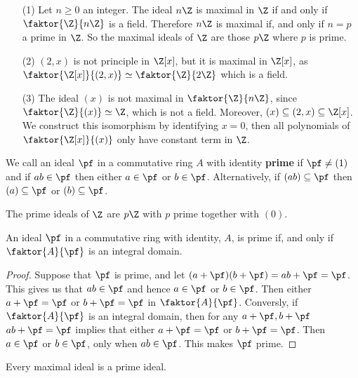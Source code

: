 \begin{example}\label{1.15}
    \begin{enumerate}
        \item[(1)] Let $n \geq 0$ an integer. The ideal  $n\Z$ is maximal in
            $\Z$ if and only if  $\faktor{\Z}{n\Z}$ is a field. Therefore $n\Z$
            is maximal if, and only if  $n=p$ a prime in $\Z$. So the maximal
            ideals of $\Z$ are those  $p\Z$ where  $p$ is prime.

        \item[(2)] $(2,x)$ is not principle in $\Z[x]$, but it is maximal in
            $\Z[x]$, as $\faktor{\Z[x]}{(2,x)} \simeq \faktor{\Z}{2\Z}$ which
            is a field.

        \item[(3)] The ideal $(x)$ is not maximal in $\faktor{\Z}{n\Z}$, since
            $\faktor{\Z}{(x)} \simeq \Z$, which is not a field. Moreover, $(x)
            \subseteq (2,x) \subseteq \Z[x]$. We construct this isomorphism by
            identifying $x=0$, then all polynomials of $\faktor{\Z[x]}{(x)}$ only
            have constant term in $\Z$.
    \end{enumerate}
\end{example}

\begin{definition}
    We call an ideal $\pf$ in a commutative ring  $A$ with identity
    \textbf{prime} if $\pf \neq (1)$ and if $ab \in \pf$ then either $a \in \pf$
    or $b \in \pf$. Alternatively, if $(ab) \subseteq \pf$ then $(a) \subseteq
    \pf$ or $(b) \subseteq \pf$.
\end{definition}

\begin{example}\label{1.16}
    The prime ideals of $\Z$ are $p\Z$ with  $p$ prime together with $(0)$.
\end{example}

\begin{lemma}\label{1.4.4}
    An ideal $\pf$ in a commutative ring with identity, $A$, is prime if, and
    only if $\faktor{A}{\pf}$ is an integral domain.
\end{lemma}
\begin{proof}
    Suppose that $\pf$ is prime, and let  $(a+\pf)(b+\pf)=ab+\pf=\pf$. This
    gives us that $ab \in \pf$ and hence  $a \in \pf$ or  $b \in \pf$. Then
    either $a+\pf=\pf$ or $b+\pf=\pf$ in $\faktor{A}{\pf}$. Conversly, if
    $\faktor{A}{\pf}$ is an integral domain, then for any $a+\pf,b+\pf$
    $ab+\pf=\pf$ implies that either $a+\pf=\pf$ or  $b+\pf=\pf$. Then
     $a \in \pf$ or  $b \in \pf$, only when  $ab \in \pf$. This makes $\pf$ prime.
\end{proof}
\begin{corollary}
    Every maximal ideal is a prime ideal.
\end{corollary}

